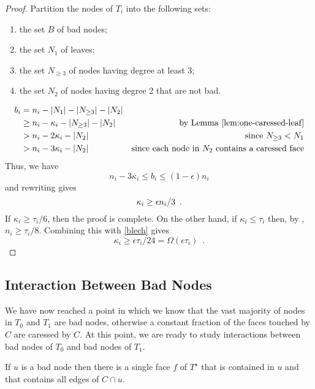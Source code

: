 \documentclass{patmorin}
\newcommand{\dual}[1]{{#1}^\star}
\begin{document}
\begin{proof}
   Partition the nodes of $T_i$ into the following sets:
   \begin{enumerate}
       \item the set $B$ of bad nodes;
       \item the set $N_1$ of leaves;
       \item the set $N_{\ge 3}$ of nodes having degree at least 3;
       \item the set $N_2$ of nodes having degree 2 that are not bad.
   \end{enumerate}
   \begin{align*}
     b_i & = n_i - |N_1|- |N_{\ge 3}|-|N_2| \\
         & \ge  n_i - \kappa_i - |N_{\ge 3}|-|N_2| 
           & \text{by \lemref{one-caressed-leaf}} \\
          & >  n_i - 2\kappa_i -|N_2| 
           & \text{since $N_{\ge 3} < N_1$} \\
           & >  n_i - 3\kappa_i -|N_2| 
           & \text{since each node in $N_2$ contains a caressed face}
    \end{align*}
    Thus, we have
    \[
          n_i-3\kappa_i \le b_i \le (1-\epsilon)n_i
    \]
    and rewriting gives 
    \begin{equation}
      \kappa_i \ge \epsilon n_i/3 \enspace . \eqlabel{blech}
    \end{equation}
    If $\kappa_i \ge \tau_i/6$, then the proof is complete.  On the other hand, if $\kappa_i \le \tau_i$ then, by , $n_i \ge \tau_i/8$. Combining this with \eqref{blech}  gives
    \[
      \kappa_i \ge \epsilon\tau_i/24 = \Omega(\epsilon \tau_i) \enspace .
    \]
\end{proof}

\subsection{Interaction Between Bad Nodes}

We have now reached a point in which we know that the vast majority of
nodes in $T_0$ and $T_1$ are bad nodes, otherwise a constant fraction
of the faces touched by $C$ are caressed by $C$.  
At this point, we are ready to study interactions between bad nodes
of $T_0$ and bad nodes of $T_1$.


\begin{lem}
   If $u$ is a bad node then there is a single face $f$ of $\dual{T}$
   that is contained in $u$ and that contains all edges of $C\cap u$.
\end{lem}
\end{document}
